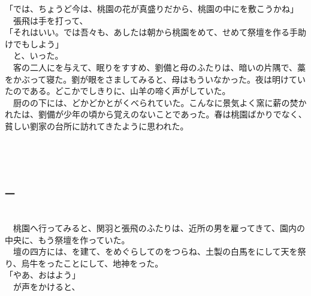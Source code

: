 \documentclass[
  paper=a5,
  fontsize=10pt,
  jafontsize=9.5pt,
  tate,                  %
  open_bracket_pos=nibu, %
]{jlreq}
\begin{document}
「では、ちょうど今は、桃園の花が真盛りだから、桃園の中にを敷こうかね」\\


　張飛は手を打って、\\


「それはいい。では吾々も、あしたは朝から桃園をめて、せめて祭壇を作る手助けでもしよう」\\


　と、いった。\\


　客の二人にを与えて、眠りをすすめ、劉備と母のふたりは、暗いの片隅で、藁をかぶって寝た。劉が眼をさましてみると、母はもういなかった。夜は明けていたのである。どこかでしきりに、山羊の啼く声がしていた。\\


　厨のの下には、どかどかとがくべられていた。こんなに景気よく窯に薪の焚かれたは、劉備が少年の頃から覚えのないことであった。春は桃園ばかりでなく、貧しい劉家の台所に訪れてきたように思われた。\\

\\

\subsection{}

\\

\subsubsection{一}

\\


　桃園へ行ってみると、関羽と張飛のふたりは、近所の男を雇ってきて、園内の中央に、もう祭壇を作っていた。\\


　壇の四方には、を建て、をめぐらしてのをつらね、土製の白馬をにして天を祭り、烏牛をったことにして、地神をった。\\


「やあ、おはよう」\\


　が声をかけると、\\
\end{document}
